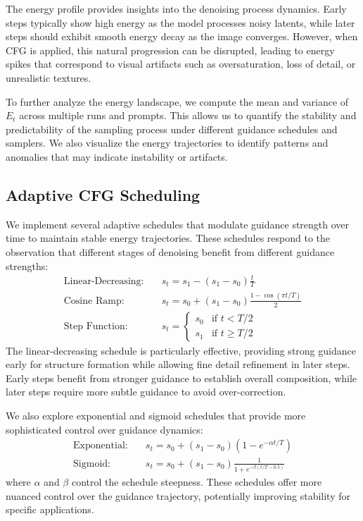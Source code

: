 \documentclass[10pt,twocolumn]{article}
\begin{document}
The energy profile provides insights into the denoising process dynamics. Early steps typically show high energy as the model processes noisy latents, while later steps should exhibit smooth energy decay as the image converges. However, when CFG is applied, this natural progression can be disrupted, leading to energy spikes that correspond to visual artifacts such as oversaturation, loss of detail, or unrealistic textures.

To further analyze the energy landscape, we compute the mean and variance of $E_t$ across multiple runs and prompts. This allows us to quantify the stability and predictability of the sampling process under different guidance schedules and samplers. We also visualize the energy trajectories to identify patterns and anomalies that may indicate instability or artifacts.

\subsection{Adaptive CFG Scheduling}
We implement several adaptive schedules that modulate guidance strength over time to maintain stable energy trajectories. These schedules respond to the observation that different stages of denoising benefit from different guidance strengths:
\begin{align}
\text{Linear-Decreasing:}\quad & s_t = s_1 - (s_1 - s_0)\frac{t}{T} \\
\text{Cosine Ramp:}\quad & s_t = s_0 + (s_1 - s_0)\frac{1 - \cos(\pi t / T)}{2} \\
\text{Step Function:}\quad & s_t = \begin{cases} s_0 & \text{if } t < T/2 \\ s_1 & \text{if } t \geq T/2 \end{cases}
\end{align}
The linear-decreasing schedule is particularly effective, providing strong guidance early for structure formation while allowing fine detail refinement in later steps. Early steps benefit from stronger guidance to establish overall composition, while later steps require more subtle guidance to avoid over-correction.

We also explore exponential and sigmoid schedules that provide more sophisticated control over guidance dynamics:
\begin{align}
\text{Exponential:}\quad & s_t = s_0 + (s_1 - s_0)(1 - e^{-\alpha t/T}) \\
\text{Sigmoid:}\quad & s_t = s_0 + (s_1 - s_0)\frac{1}{1 + e^{-\beta(t/T - 0.5)}}
\end{align}
where $\alpha$ and $\beta$ control the schedule steepness. These schedules offer more nuanced control over the guidance trajectory, potentially improving stability for specific applications.
\end{document}
